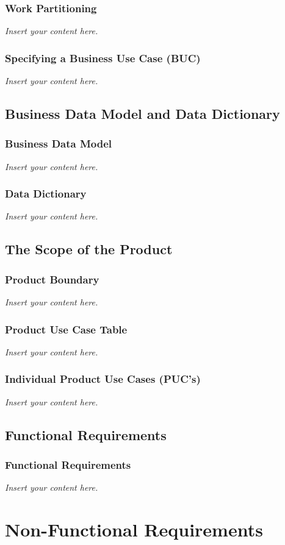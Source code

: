 \documentclass[12pt]{article}
\newcommand{\lips}{\textit{Insert your content here.}}
\begin{document}
\subsubsection{Work Partitioning}
\lips
\subsubsection{Specifying a Business Use Case (BUC)}
\lips

\subsection{Business Data Model and Data Dictionary}
\subsubsection{Business Data Model}
\lips
\subsubsection{Data Dictionary}
\lips

\subsection{The Scope of the Product}
\subsubsection{Product Boundary}
\lips
\subsubsection{Product Use Case Table}
\lips
\subsubsection{Individual Product Use Cases (PUC's)}
\lips

\subsection{Functional Requirements}
\subsubsection{Functional Requirements}
\lips

\section{Non-Functional Requirements}
\end{document}
